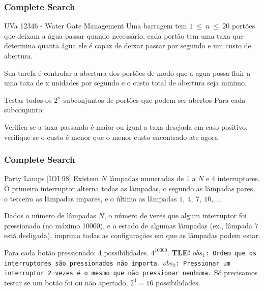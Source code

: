 \begin{frame}
\frametitle{Complete Search}
\begin{block}{UVa 12346 - Water Gate Management}
Uma barragem tem $1\ \leq\ n\ \leq\ 20$ portões que deixam a água passar quando necessário, cada portão tem uma taxa que determina quanta água ele é capaz de deixar passar por segundo e um custo de abertura.
\begin{itemize}
	\bitem Sua tarefa é controlar a abertura dos portões de modo que a agua possa fluir a uma taxa de x unidades por segundo e o custo total de abertura seja minimo.
\end{itemize}
\end{block}
\pause
\begin{block}{}
\begin{itemize}
	\bitem Testar todos os $2^n$ subconjuntos de portões que podem ser abertos
	\bitem Para cada subconjunto:
	\begin{itemize}
		\bitem Verifica se a taxa passando é maior ou igual a taxa desejada
		\bitem em caso positivo, verifique se o custo é menor que o menor custo encontrado ate agora
	\end{itemize}
\end{itemize}
\end{block}
\end{frame}

\begin{frame}
\frametitle{Complete Search}
\scriptsize
\begin{block}{Party Lamps [IOI 98]}
Existem $N$ lâmpadas numeradas de $1$ a $N$ e 4 interruptores. O primeiro interruptor alterna todas as lâmpadas, o segundo as lâmpadas pares, o terceiro as lâmpadas impares,
e o último as lâmpadas $1,\ 4,\ 7,\ 10,\ ...$
\begin{itemize}
	\bitem Dados o número de lâmpadas $N$, o número de vezes que algum interruptor foi pressionado (no máximo 10000), e o estado de algumas lâmpadas (ex., lâmpada 7 está desligada), imprima todas as configurações em que as lâmpadas podem estar.
\end{itemize}
\end{block}
\pause
\begin{block}{}
\begin{itemize}
	\bitem Para cada botão pressionado: 4 possibilidades. $4^{10000}$. \textbf{TLE!}
	\bitem \texttt{$obs_1$: Ordem que os interruptores são pressionados não importa.}
	\bitem \texttt{$obs_2$: Pressionar um interruptor 2 vezes é o mesmo que não pressionar nenhuma.}
	\bitem Só precisamos testar se um botão foi ou não apertado, $2^4 = 16$ possibilidades.
\end{itemize}
\end{block}
\end{frame}

